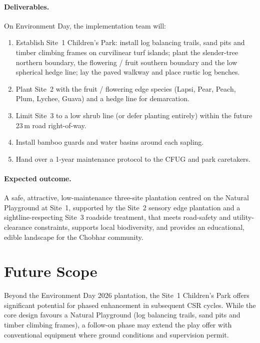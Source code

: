 \documentclass[11pt,a4paper]{article}
\begin{document}
\paragraph{Deliverables.} On Environment Day, the implementation team will:
\begin{enumerate}
  \item Establish Site~1 Children's Park: install log balancing trails, sand pits and timber climbing frames on curvilinear turf islands; plant the slender-tree northern boundary, the flowering / fruit southern boundary and the low spherical hedge line; lay the paved walkway and place rustic log benches.
  \item Plant Site~2 with the fruit / flowering edge species (Lapsi, Pear, Peach, Plum, Lychee, Guava) and a hedge line for demarcation.
  \item Limit Site~3 to a low shrub line (or defer planting entirely) within the future 23\,m road right-of-way.
  \item Install bamboo guards and water basins around each sapling.
  \item Hand over a 1-year maintenance protocol to the CFUG and park caretakers.
\end{enumerate}

\paragraph{Expected outcome.} A safe, attractive, low-maintenance three-site plantation centred on the Natural Playground at Site~1, supported by the Site~2 sensory edge plantation and a sightline-respecting Site~3 roadside treatment, that meets road-safety and utility-clearance constraints, supports local biodiversity, and provides an educational, edible landscape for the Chobhar community.

\section{Future Scope}
\label{sec:future-scope}

Beyond the Environment Day 2026 plantation, the Site~1 Children's Park offers significant potential for phased enhancement in subsequent CSR cycles. While the core design favours a Natural Playground (log balancing trails, sand pits and timber climbing frames), a follow-on phase may extend the play offer with conventional equipment where ground conditions and supervision permit.
\end{document}
